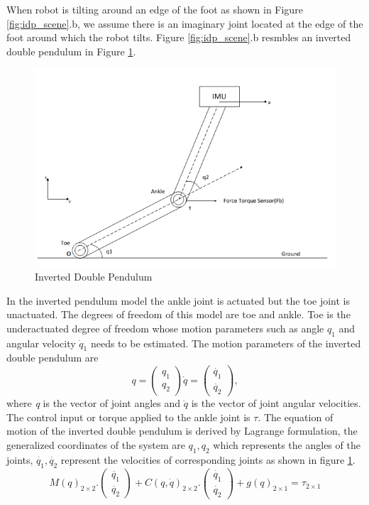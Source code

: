 When robot is tilting around an edge of the foot as shown in Figure \ref{fig:idp_scene}.b, we assume there is an imaginary joint located at the edge of the foot around which the robot tilts. Figure \ref{fig:idp_scene}.b resmbles an inverted double pendulum in Figure \ref{fig:idp}.
\begin{figure}[H]
	\centering
	\includegraphics[scale=0.75]{Bilder/doublePendulum1.png}
	\caption{Inverted Double Pendulum}	
	\label{fig:idp}
\end{figure}
 In the inverted pendulum model the ankle joint is actuated but the toe joint is unactuated. The degrees of freedom of this model are toe and ankle. Toe is the underactuated degree of freedom whose motion parameters such as angle $q_1$ and angular velocity $\dot{q}_1$ needs to be estimated. The motion parameters of the inverted double pendulum are 
\begin{equation}
	 q = 
	\begin{pmatrix}
		q_{1}\\
		q_{2}
	\end{pmatrix}
	 \dot{q} = 
	\begin{pmatrix}
		\dot{q_{1}}\\
		\dot{q_{2}}
	\end{pmatrix},
\end{equation}
where \emph{q} is the vector of joint angles and $\dot{q}$ is the vector of joint angular velocities. The control input or torque applied to the ankle joint is $\tau$. The equation of motion of the inverted double pendulum is derived by Lagrange formulation, the generalized coordinates of the system are $q_1,q_2$ which represents the angles of the joints, $\dot{q_1},\dot{q_2}$ represent the velocities of corresponding joints as shown in figure \ref{fig:idp}.
\begin{equation}
	M(q)_{2\times2}.
	\begin{pmatrix}
		\ddot{q_{1}} \\
		\ddot{q_{2}} 
	\end{pmatrix}
	+ C(q,\dot{q})_{2\times2}.
	\begin{pmatrix}
		\dot{q_{1}} \\
		\dot{q_{2}} 
	\end{pmatrix}
	+ g(q)_{2\times 1} = \tau_{2\times 1}
\end{equation}

